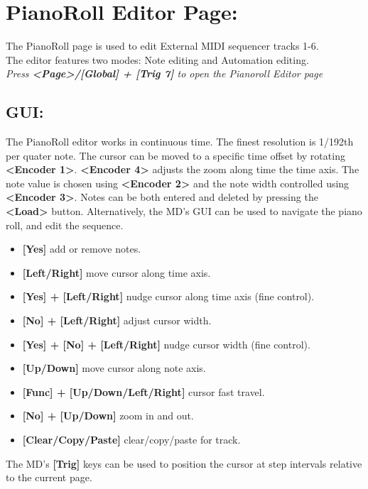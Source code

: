 \chapter{PianoRoll Editor Page:}
The PianoRoll page is used to edit External MIDI sequencer tracks 1-6.\\
The editor features two modes: Note editing and Automation editing.
\\
\textit{Press \textbf{<Page>/[Global] + [Trig 7]} to open the Pianoroll Editor page}
\section{GUI:}
The PianoRoll editor works in continuous time. The finest resolution is 1/192th per quater note. The cursor can be moved to a specific time offset by rotating \textbf{<Encoder 1>}. \textbf{<Encoder 4>} adjusts the zoom along time the time axis. The note value is chosen using \textbf{<Encoder 2>} and the note width controlled using \textbf{<Encoder 3>}. Notes can be both entered and deleted by pressing the \textbf{<Load>} button.
\newpage
Alternatively, the MD's GUI can be used to navigate the piano roll, and edit the sequence.
\begin{itemize}
     \item \textbf{[Yes]} add or remove notes.
     \item \textbf{[Left/Right]} move cursor along time axis.
     \item \textbf{[Yes] + [Left/Right]} nudge cursor along time axis (fine control).
     \item \textbf{[No] + [Left/Right]} adjust cursor width.
     \item \textbf{[Yes] + [No] + [Left/Right]} nudge cursor width (fine control).
     \item \textbf{[Up/Down]} move cursor along note axis.
     \item \textbf{[Func] + [Up/Down/Left/Right]} cursor fast travel.
     \item \textbf{[No] + [Up/Down]} zoom in and out.
     \item \textbf{[Clear/Copy/Paste]} clear/copy/paste for track.
\end{itemize}
The MD's \textbf{[Trig]} keys can be used to position the cursor at step intervals relative to the current page.\\
